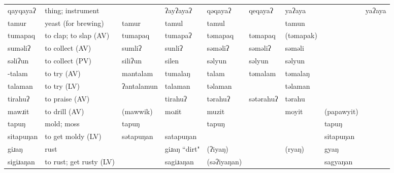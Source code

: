 \begin{landscape}
\begin{longtable}{*{9}{>{\raggedright\arraybackslash}p{}}}
\text{*}qayqayaʔ & thing; instrument &  & ʔayʔayaʔ & qəqayaʔ & qeqayaʔ & yaʔaya &  & yaʔaya\\
\text{*}tamur & yeast (for brewing) & tamur & tamul & tamul &  & tamun &  & \\
\text{*}tumapaq & to clap; to slap (AV) & tumapaq & tumapaʔ & təmapaq & təmapaq & (təmapak) &  & \\
\text{*}suməliʔ & to collect (AV) & sumliʔ & sunliʔ & səməliʔ & səməliʔ & səməli &  & \\
\text{*}səliʔun & to collect (PV) & siliʔun & silen & səlyun & səlyun & səlyun &  & \\
\text{*}-talam & to try (AV) & mantalam & tumalaŋ & talam & təmalam & təmalaŋ &  & \\
\text{*}talaman & to try (LV) & ʔantalamun & talaman & təlaman &  & təlaman &  & \\
\text{*}tirahuʔ & to praise (AV) &  & tirahuʔ & tərahuʔ & sətərahuʔ & tərahu &  & \\
\text{*}mawɹit & to drill (AV) & (mawwik) & moɹit & muzit &  & moyit & (papawyit) & \\
\text{*}tapuŋ & mold; moss & tapuŋ &  & tapuŋ &  &  & tapuŋ & \\
\text{*}sitapuŋan & to get moldy (LV) & sətapuŋan & satapuŋan &  &  &  & sitapuŋan & \\
\text{*}giɹaŋ & rust &  & giɹaŋ ``dirt" & (ʔiyaŋ) &  & (ryaŋ) & gyaŋ & \\
\text{*}sigiɹaŋan & to rust; get rusty (LV) &  & sagiɹaŋan & (səʔiyaŋan) &  &  & sagyaŋan & \\
\end{longtable}

\end{landscape}
